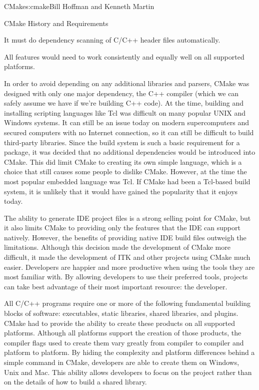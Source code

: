 \begin{aosachapter}{CMake}{s:cmake}{Bill Hoffman and Kenneth Martin}
\begin{aosasect1}{CMake History and Requirements}
\begin{aosaitemize}
  \item It must do dependency scanning of C/C++ header files
    automatically.

  \item All features would need to work consistently and equally well
    on all supported platforms.

\end{aosaitemize}

In order to avoid depending on any additional libraries and parsers,
CMake was designed with only one major dependency, the C++ compiler
(which we can safely assume we have if we're building C++ code). At the
time, building and installing scripting languages like Tcl was difficult
on many popular UNIX and Windows systems. It can still be an
issue today on modern supercomputers and secured computers with no
Internet connection, so it can still be difficult to build third-party
libraries. Since the build
system is such a basic requirement for a package, it was decided that no
additional dependencies would be introduced into CMake. This
did limit CMake to creating its own simple language, which is a choice
that still causes some people to dislike CMake. However, at the time
the most popular embedded language was Tcl. If CMake had been a
Tcl-based build system, it is unlikely that it would have gained the
popularity that it enjoys today.

The ability to generate IDE project files is a strong selling point
for CMake, but it also limits CMake to providing only the features
that the IDE can support natively.  However, the benefits of providing
native IDE build files outweigh the limitations.  Although this
decision made the development of CMake more difficult, it made the
development of ITK and other projects using CMake much easier.
Developers are happier and more productive when using the tools they
are most familiar with.  By allowing developers to use their preferred
tools, projects can take best advantage of their most important
resource: the developer.

All C/C++ programs require one or more of the following fundamental
building blocks of software: executables, static libraries, shared
libraries, and plugins. CMake had to provide the ability to create
these products on all supported platforms. Although all platforms
support the creation of those products, the compiler flags used to
create them vary greatly from compiler to compiler and platform to
platform.  By hiding the complexity and platform differences behind a
simple command in CMake, developers are able to create them on
Windows, Unix and Mac. This ability allows developers to focus on the
project rather than on the details of how to build a shared library.


\end{aosasect1}
\end{aosachapter}
